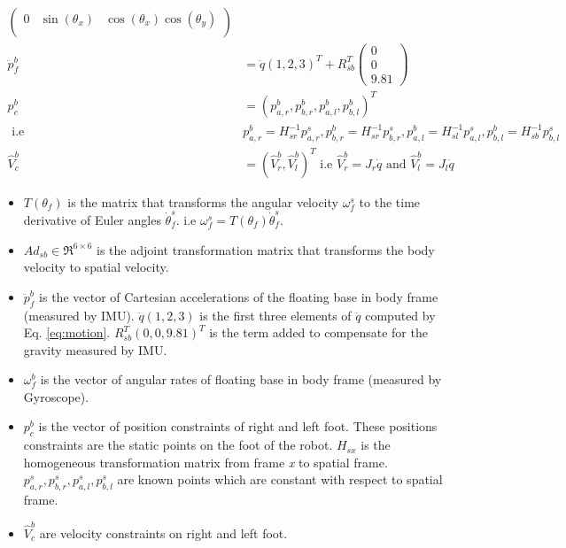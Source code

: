 \begin{equation}
\begin{split}
\begin{pmatrix}
	0 &\sin(\theta_{x}) &\cos(\theta_{x})\cos(\theta_{y})\\
	\end{pmatrix}	\\
	\ddot{p}_{f}^{b} &= \ddot{q}(1,2,3)^{T} + R_{sb}^{T} 
	\begin{pmatrix}
	0 \\ 0 \\ 9.81
	\end{pmatrix}\\
	p_{c}^{b} &= (p_{a,r}^{b}, p_{b,r}^{b}, p_{a,l}^{b}, p_{b,l}^{b} )^{T} \\
	 \text{ i.e } &p_{a,r}^{b} = H_{sr}^{-1} p_{a,r}^{s},p_{b,r}^{b} = H_{sr}^{-1} p_{b,r}^{s},p_{a,l}^{b} = H_{sl}^{-1} p_{a,l}^{s},p_{b,l}^{b} = H_{sb}^{-1} p_{b,l}^{s}  \\
	\hat{V}_{c}^{b} &= (\hat{V}_{r}^{b},\hat{V}_{l}^{b})^{T} \text{ i.e } \hat{V}_{r}^{b} = J_{r}\dot{q} \text{ and } \hat{V}_{l}^{b} = J_{l}\dot{q}
	\end{split}
	\end{equation}
\begin{itemize}
\item $T(\theta_{f})$ is the matrix that transforms the angular velocity $\omega_{f}^{s}$ to the time derivative of Euler angles $\dot{\theta}_{f}^{s}$. i.e $\omega_{f}^{s}=T(\theta_{f}) \dot{\theta}_{f}^{s}$. 
\item $Ad_{sb} \in \Re^{6 \times 6}$ is the adjoint transformation matrix that transforms the body velocity to spatial velocity. 
\item $\ddot{p}_{f}^{b}$ is the vector of Cartesian accelerations of the floating base in body frame (measured by IMU).	$\ddot{q}(1,2,3)$ is the first three elements of $\ddot{q}$ computed by Eq. \ref{eq:motion}. $R_{sb}^{T}(0,0,9.81)^{T}$ is the term added to compensate for the gravity measured by IMU. 
\item $\omega_{f}^{b} $ is the vector of angular rates of floating base in body frame (measured by Gyroscope). 
\item $p_{c}^{b}$ is the vector of position constraints of right and left foot. These positions constraints are the static points on the foot of the robot. $H_{sx}$ is the homogeneous transformation matrix from frame \emph{x} to spatial frame. $p_{a,r}^{s}, p_{b,r}^{s}, p_{a,l}^{s}, p_{b,l}^{s}$ are known points which are constant with respect to spatial frame.
\item $\hat{V}_{c}^{b}$ are velocity constraints on right and left foot.
\end{itemize}
